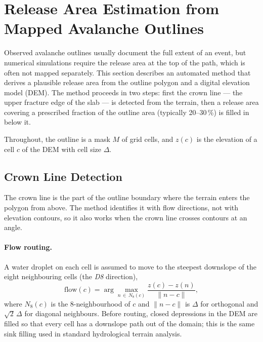 
\section{Release Area Estimation from Mapped Avalanche Outlines}
\label{sec:release_estimation}

Observed avalanche outlines usually document the full extent of an event, but
numerical simulations require the release area at the top of the path, which is
often not mapped separately. This section describes an automated method that
derives a plausible release area from the outline polygon and a digital
elevation model (DEM). The method proceeds in two steps: first the crown line
--- the upper fracture edge of the slab --- is detected from the terrain, then
a release area covering a prescribed fraction of the outline area (typically
20--30\,\%) is filled in below it.

Throughout, the outline is a mask $M$ of grid cells, and $z(c)$ is the elevation
of a cell $c$ of the DEM with cell size $\Delta$.

\subsection{Crown Line Detection}
\label{sec:crown_detection}

The crown line is the part of the outline boundary where the terrain enters the
polygon from above. The method identifies it with flow directions, not with
elevation contours, so it also works when the crown line crosses contours at an
angle.

\paragraph{Flow routing.}
A water droplet on each cell is assumed to move to the steepest downslope of
the eight neighbouring cells (the \emph{D8} direction),
\begin{equation}
  \mathrm{flow}(c)
  = \arg\max_{n \,\in\, N_8(c)} \frac{z(c) - z(n)}{\lVert n - c \rVert},
  \label{eq:d8}
\end{equation}
where $N_8(c)$ is the 8-neighbourhood of $c$ and $\lVert n - c \rVert$ is
$\Delta$ for orthogonal and $\sqrt{2}\,\Delta$ for diagonal neighbours. Before
routing, closed depressions in the DEM are filled so that every cell has a
downslope path out of the domain; this is the same sink filling used in
standard hydrological terrain analysis.

